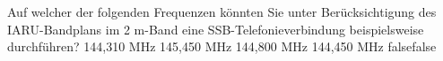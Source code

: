     {Auf welcher der folgenden Frequenzen könnten Sie unter Berücksichtigung des IARU-Bandplans im 2 m-Band eine SSB-Telefonieverbindung beispielsweise durchführen?}
    {144,310 MHz}
    {145,450 MHz}
    {144,800 MHz}
    {144,450 MHz}
    {false}{false}